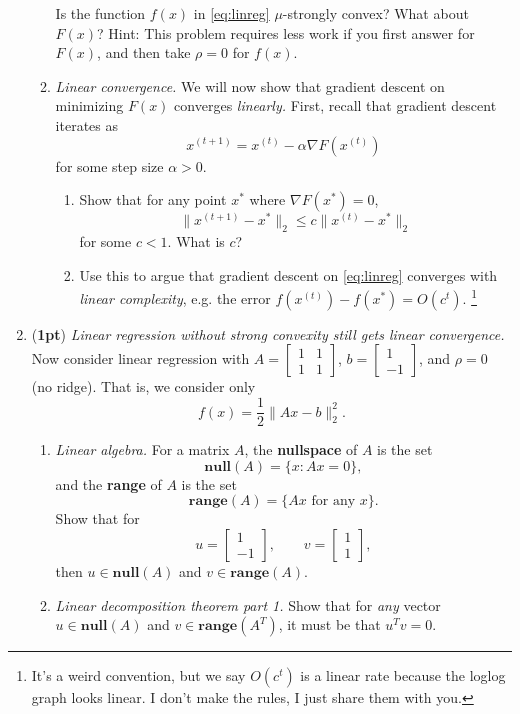 \documentclass{article}
\newcommand{\bmat}{\left[\begin{matrix}}
\newcommand{\emat}{\end{matrix}\right]}
\newcommand{\range}{\mathbf{range}}
\newcommand{\vnull}{\mathbf{null}}
\newcommand{\showpoints}[1]{(\textbf{#1})}
\begin{document}
\begin{enumerate}
\begin{enumerate}
Is the function $f(x)$ in \eqref{eq:linreg} $\mu$-strongly convex? What about  $F(x)$?
Hint: This problem requires less work if you first answer for $F(x)$, and then take $\rho = 0$ for $f(x)$. 




\item \emph{Linear convergence.} We will now show that gradient descent on minimizing $F(x)$ converges \emph{linearly.} First, recall that gradient descent iterates as 
\[
x^{(t+1)} = x^{(t)} - \alpha\nabla F(x^{(t)})
\]
for some step size $\alpha > 0$. 
\begin{enumerate}
\item Show that for any point $x^*$ where $\nabla F(x^*) = 0$,
\[
\|x^{(t+1)}-x^*\|_2 \leq c \|x^{(t)}-x^*\|_2
\]
for some $c < 1$. What is $c$?



\item Use this to argue that gradient descent on \eqref{eq:linreg} converges with  \emph{linear complexity}, e.g.  the error $f(x^{(t)}) - f(x^*) = O(c^t)$.
\footnote{It's a weird convention, but we say $O(c^t)$ is a linear rate because the loglog graph looks linear. I don't make the rules, I just share them with you.}




\end{enumerate}
\end{enumerate}

\item \showpoints{1pt} \emph{Linear regression without strong convexity still gets linear convergence.} Now consider linear regression with $A = \bmat 1 & 1 \\ 1 & 1 \emat$,  $b = \bmat 1 \\ -1\emat $, and $\rho = 0$ (no ridge). 
That is, we consider only 
\[
f(x) = \frac{1}{2}\|Ax-b\|_2^2.
\]
\begin{enumerate}
\item \emph{Linear algebra.} For a matrix $A$, the \textbf{nullspace} of $A$ is the set 
\[
\vnull(A) = \{x : Ax = 0\},
\]
and the \textbf{range} of $A$ is the set 
\[
\range(A) = \{Ax \text{ for any } x\}.
\]
Show that for 
\[
u = \bmat 1 \\ -1 \emat, \qquad v = \bmat 1 \\ 1 \emat,
\]
then $u\in \vnull(A)$ and $v\in \range(A)$.



\item 
\emph{Linear decomposition theorem part 1.}
Show that for \emph{any} vector $u\in \vnull(A)$ and $v\in \range(A^T)$, it must be that $u^Tv = 0$.




\end{enumerate}
\end{enumerate}
\end{document}
